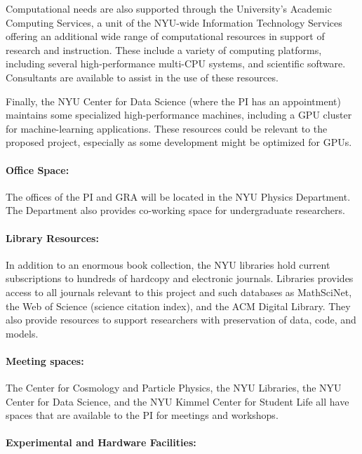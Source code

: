 \documentclass[12pt]{article}
\begin{document}
Computational needs are also supported through the University's
Academic Computing Services, a unit of the NYU-wide Information
Technology Services offering an additional wide range of computational
resources in support of research and instruction.  These include a
variety of computing platforms, including several high-performance
multi-CPU systems, and scientific software.  Consultants are available
to assist in the use of these resources.

Finally, the NYU Center for Data Science (where the PI has an appointment)
maintains some specialized high-performance machines, including a GPU
cluster for machine-learning
applications. These resources could be relevant to the proposed project,
especially as some development might be optimized for GPUs.

\paragraph{Office Space:}

The offices of the PI and GRA will be located in the NYU Physics
Department. The Department also provides co-working space for
undergraduate researchers.

\paragraph{Library Resources:}

In addition to an enormous book collection, the NYU libraries hold
current subscriptions to hundreds of hardcopy and electronic journals.
Libraries provides access to all journals relevant to this project and such
databases as MathSciNet, the Web of Science (science citation index),
and the ACM Digital Library. They also provide resources to support
researchers with preservation of data, code, and models.

\paragraph{Meeting spaces:}

The Center for Cosmology and Particle Physics, the NYU Libraries, the
NYU Center for Data Science, and the NYU Kimmel Center for Student
Life all have spaces that are available to the PI for meetings and
workshops.

\paragraph{Experimental and Hardware Facilities:}
\end{document}

